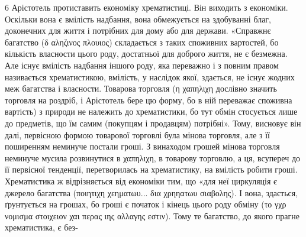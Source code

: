 6 Арістотель протиставить економіку хрематистиці. Він виходить
з економіки. Оскільки вона є вмілість надбання, вона обмежується на здобуванні
благ, доконечних для життя і потрібних для дому або для держави.
«Справжнє багатство (δ αληζινος πλουιος) складається з таких споживних
вартостей, бо кількість власности цього роду, достатньої для
доброго життя, не є безмежна. Але існує вмілість надбання іншого роду,
яка переважно і з повним правом називається хрематистикою, вмілість,
у наслідок якої, здається, не існує жодних меж багатства і власности.
Товарова торговля (η χαπηλιχη    дослівно значить торговля на роздріб,
і Арістотель бере цю форму, бо в ній переважає споживна вартість) з природи
не належить до хрематистики, бо тут обмін стосується лише до предметів,
що їм самим (покупцям і продавцям) потрібні». Тому, висновує
він далі, первісною формою товарової торговлі була мінова торговля,
але з її поширенням неминуче постали гроші. З винаходом грошей мінова
торговля неминуче мусила розвинутися в χαπηλιχη, в товарову торговлю,
а ця, всупереч до її первісної тенденції, перетворилась на хрематистику,
на вмілість робити гроші. Хрематистика ж відрізняється від економіки
тим, що «для неї циркуляція є джерело багатства (ποιητιχη χεηματωυ... δια χρηηατωυ σιαβολης). І
вона, здається, ґрунтується на грошах, бо гроші є початок і кінець цього роду обміну (το γχρ νομισμα
στοιχειον χαι περας ιης αλλαγης εστιν). Тому те багатство, до якого прагне хрематистика, є без-
